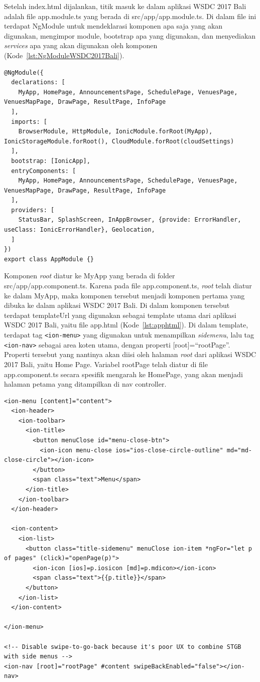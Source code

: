 Setelah index.html dijalankan, titik masuk ke dalam aplikasi WSDC 2017 Bali adalah file app.module.ts yang berada di src/app/app.module.ts. Di dalam file ini terdapat NgModule untuk mendeklarasi komponen apa saja yang akan digunakan, mengimpor module, bootstrap apa yang digunakan, dan menyediakan \textit{services} apa yang akan digunakan oleh komponen (Kode~\ref{lst:NgModuleWSDC2017Bali}).  

\begin{lstlisting}[label={lst:NgModuleWSDC2017Bali}, caption=NgModule pada app.module.ts]
@NgModule({
  declarations: [
    MyApp, HomePage, AnnouncementsPage, SchedulePage, VenuesPage, VenuesMapPage, DrawPage, ResultPage, InfoPage
  ],
  imports: [
    BrowserModule, HttpModule, IonicModule.forRoot(MyApp), IonicStorageModule.forRoot(), CloudModule.forRoot(cloudSettings)
  ],
  bootstrap: [IonicApp],
  entryComponents: [
    MyApp, HomePage, AnnouncementsPage, SchedulePage, VenuesPage, VenuesMapPage, DrawPage, ResultPage, InfoPage
  ],
  providers: [
    StatusBar, SplashScreen, InAppBrowser, {provide: ErrorHandler, useClass: IonicErrorHandler}, Geolocation,
  ]
})
export class AppModule {}
\end{lstlisting} 

Komponen \textit{root} diatur ke MyApp yang berada di folder src/app/app.component.ts. Karena pada file app.component.ts, \textit{root} telah diatur ke dalam MyApp, maka komponen tersebut menjadi komponen pertama yang dibuka ke dalam aplikasi WSDC 2017 Bali. Di dalam komponen tersebut terdapat templateUrl yang digunakan sebagai template utama dari aplikasi WSDC 2017 Bali, yaitu file app.html (Kode~\ref{lst:apphtml}). Di dalam template, terdapat tag \texttt{<ion-menu>} yang digunakan untuk menampilkan \textit{sidemenu}, lalu tag \texttt{<ion-nav>} sebagai area koten utama, dengan properti [root]=``rootPage''. Properti tersebut yang nantinya akan diisi oleh halaman \textit{root} dari aplikasi WSDC 2017 Bali, yaitu Home Page. Variabel rootPage telah diatur di file app.component.ts secara spesifik mengarah ke HomePage, yang akan menjadi halaman petama yang ditampilkan di nav controller. 


\begin{lstlisting}[label={lst:apphtml}, caption=\textit{Source Code} File app.html]
<ion-menu [content]="content">
  <ion-header>
    <ion-toolbar>
      <ion-title>
        <button menuClose id="menu-close-btn">
          <ion-icon menu-close ios="ios-close-circle-outline" md="md-close-circle"></ion-icon>
        </button>
        <span class="text">Menu</span>
      </ion-title>
    </ion-toolbar>
  </ion-header>

  <ion-content>
    <ion-list>
      <button class="title-sidemenu" menuClose ion-item *ngFor="let p of pages" (click)="openPage(p)">
        <ion-icon [ios]=p.iosicon [md]=p.mdicon></ion-icon>
        <span class="text">{{p.title}}</span>
      </button>
    </ion-list>
  </ion-content>

</ion-menu>

<!-- Disable swipe-to-go-back because it's poor UX to combine STGB with side menus -->
<ion-nav [root]="rootPage" #content swipeBackEnabled="false"></ion-nav>

\end{lstlisting} 

